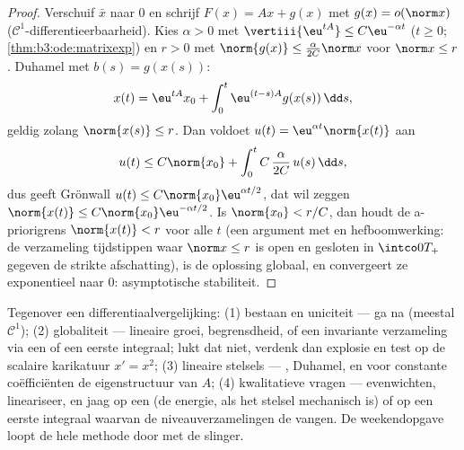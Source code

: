 \begin{proof}
Verschuif $\bar x$ naar $0$ en schrijf $F(x) = Ax + g(x)$ met
$g(x) = o(\norm x)$ ($\mathcal C^1$-differentieerbaarheid). Kies
$\alpha > 0$ met $\vertiii{\eu^{tA}} \leq C\eu^{-\alpha t}$ ($t
\geq 0$; \cref{thm:b3:ode:matrixexp}) en $r > 0$ met
$\norm{g(x)} \leq \frac{\alpha}{2C}\norm x$ voor $\norm x \leq
r$. Duhamel met $b(s) = g(x(s))$:
\[
x(t) = \eu^{tA}x_0 + \int_0^t\eu^{(t-s)A}g(x(s))\,\dd s,
\]
geldig zolang $\norm{x(s)} \leq r$. Dan voldoet $u(t) =
\eu^{\alpha t}\norm{x(t)}$ aan
\[
u(t) \leq C\norm{x_0} +
\int_0^{t}C\,\frac{\alpha}{2C}\,u(s)\,\dd s ,
\]
dus geeft Grönwall $u(t) \leq C\norm{x_0}\eu^{\alpha t/2}$, dat
wil zeggen $\norm{x(t)} \leq C\norm{x_0}\eu^{-\alpha t/2}$. Is
$\norm{x_0} < r/C$, dan houdt de a-priorigrens $\norm{x(t)} < r$
voor alle $t$ (een argument met  en hefboomwerking:
de verzameling tijdstippen waar $\norm x \leq r$ is open en
gesloten in $\intco0{T_+}$ gegeven de strikte afschatting), is de
oplossing globaal, en convergeert ze exponentieel naar $0$:
asymptotische stabiliteit.
\end{proof}

\begin{method}\label{met:b3:ode:strategy}
Tegenover een differentiaalvergelijking: (1) bestaan en
uniciteit --- ga  na (meestal $\mathcal C^1$);
(2) globaliteit --- lineaire groei, begrensdheid, of een
invariante  verzameling via een  of een
eerste integraal; lukt dat niet, verdenk dan explosie en test op
de scalaire karikatuur $x' = x^2$; (3) lineaire stelsels ---
, Duhamel, en voor constante coëfficiënten de
eigenstructuur van $A$; (4) kwalitatieve vragen --- evenwichten,
lineariseer, en jaag op een  (de energie, als het
stelsel mechanisch is) of op een eerste integraal waarvan de
niveauverzamelingen de  vangen. De weekendopgave loopt de
hele methode door met de slinger.
\end{method}


